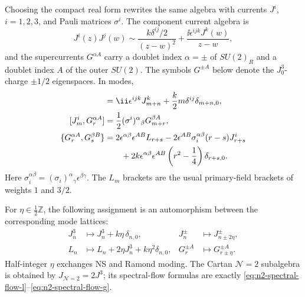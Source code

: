 Choosing the compact real form rewrites the same algebra with currents
\(J^i\), \(i=1,2,3\), and Pauli matrices \(\sigma^i\).  The component
current algebra is
\begin{equation}
  J^i(z)J^j(w)
  \sim
  \frac{k\delta^{ij}/2}{(z-w)^2}
  +\frac{\ii\epsilon^{ijk}J^k(w)}{z-w},
  \label{eq:small-n4-su2-current-ope}
\end{equation}
and the supercurrents \(G^{\alpha A}\) carry a doublet index
\(\alpha=\pm\) of \(SU(2)_R\) and a doublet index \(A\) of the outer
\(SU(2)\).  The symbols \(G^{\pm A}\) below denote the \(J^3_0\)-charge
\(\pm1/2\) eigenspaces.  In modes,
\begin{align}
  [J^i_m,J^j_n]
  &=
  \ii\epsilon^{ijk}J^k_{m+n}
  +\frac{k}{2}m\delta^{ij}\delta_{m+n,0},
  \label{eq:small-n4-jj-mode}\\
  [J^i_m,G^{\alpha A}_r]
  &=
  \frac12(\sigma^i)^\alpha{}_\beta G^{\beta A}_{m+r},
  \label{eq:small-n4-jg-mode}\\
  \{G^{\alpha A}_r,G^{\beta B}_s\}
  &=
  2\epsilon^{\alpha\beta}\epsilon^{AB}L_{r+s}
  -2\epsilon^{AB}\sigma_i^{\alpha\beta}(r-s)J^i_{r+s}
  \notag\\
  &\qquad
  +2k\epsilon^{\alpha\beta}\epsilon^{AB}
  \left(r^2-\frac14\right)\delta_{r+s,0}.
  \label{eq:small-n4-gg-mode}
\end{align}
Here
\(\sigma_i^{\alpha\beta}=(\sigma_i)^\alpha{}_\gamma\epsilon^{\beta\gamma}\).
The \(L_m\) brackets are the usual primary-field brackets of weights \(1\) and
\(3/2\).

\begin{lemma}[Small \(\mathcal N=4\) spectral flow]
\label{lem:small-n4-spectral-flow}
For \(\eta\in\frac12\mathbb Z\), the following assignment is an automorphism
between the corresponding mode lattices:
\begin{align}
  J^3_n&\longmapsto J^3_n+k\eta\,\delta_{n,0},
  &
  J^\pm_n&\longmapsto J^\pm_{n\pm2\eta},
  \label{eq:small-n4-spectral-flow-currents}\\
  L_n&\longmapsto L_n+2\eta J^3_n+k\eta^2\delta_{n,0},
  &
  G^{\pm A}_r&\longmapsto G^{\pm A}_{r\pm\eta}.
  \label{eq:small-n4-spectral-flow-stress-supercurrents}
\end{align}
Half-integer \(\eta\) exchanges NS and Ramond moding.  The Cartan
\(\mathcal N=2\) subalgebra is obtained by \(J_{\mathcal N=2}=2J^3\); its
spectral-flow formulas are exactly
\eqref{eq:n2-spectral-flow-l}--\eqref{eq:n2-spectral-flow-g}.
\end{lemma}

